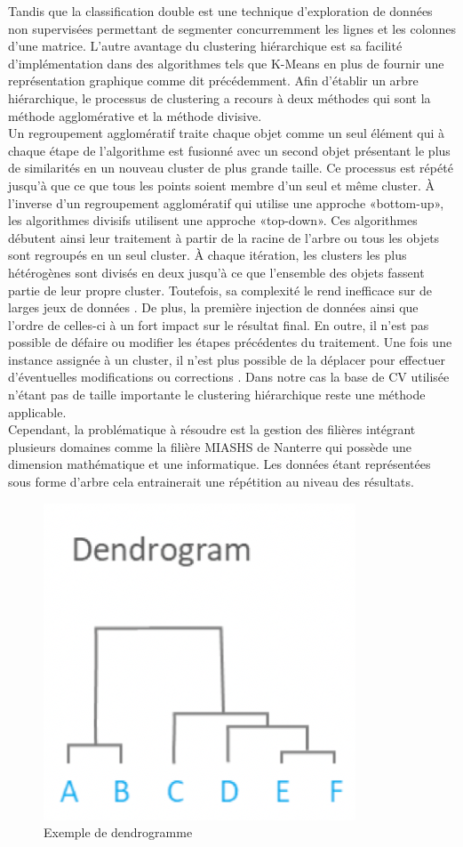 \documentclass[memoire.tex]{subfiles}
\begin{document}
 Tandis que la classification double est une technique d'exploration de données non supervisées permettant de segmenter concurremment les lignes et les colonnes d'une matrice. L'autre avantage du clustering hiérarchique est sa facilité d'implémentation dans des algorithmes tels que K-Means en plus de fournir une représentation graphique comme dit précédemment. Afin d'établir un arbre hiérarchique, le processus de clustering a recours à deux méthodes qui sont la méthode agglomérative et la méthode divisive.\\ Un regroupement agglomératif traite chaque objet comme un seul élément qui à chaque étape de l'algorithme est fusionné avec un second objet présentant le plus de similarités en un nouveau cluster de plus grande taille. Ce processus est répété jusqu'à que ce que tous les points soient membre d'un seul et même cluster. À l'inverse d'un regroupement agglomératif qui utilise une approche «bottom-up», les algorithmes divisifs utilisent une approche «top-down». Ces algorithmes débutent ainsi leur traitement à partir de la racine de l'arbre ou tous les objets sont regroupés en un seul cluster. À chaque itération, les clusters les plus hétérogènes sont divisés en deux jusqu'à ce que l'ensemble des objets fassent partie de leur propre cluster. Toutefois, sa complexité le rend inefficace sur de larges jeux de données \cite{ref7}. De plus, la première injection de données ainsi que l'ordre de celles-ci  à un fort impact sur le résultat final. En outre, il n'est pas possible de défaire ou modifier les étapes précédentes du traitement. Une fois une instance assignée à un cluster, il n'est plus possible de la déplacer pour effectuer d'éventuelles modifications ou corrections \cite{ref5}. Dans notre cas la base de CV utilisée n'étant pas de taille importante le clustering hiérarchique reste une méthode applicable. \\Cependant, la problématique à résoudre est la gestion des filières intégrant plusieurs domaines comme la filière MIASHS de Nanterre qui possède une dimension mathématique et une informatique. Les données étant représentées sous forme d'arbre cela entrainerait une répétition au niveau des résultats.
	\begin{figure}[h!]
		\centerline{\includegraphics[scale=0.5]{img/hierarchical_clustering.png}}
		\caption{Exemple de dendrogramme}
	\end{figure}
	
\end{document}
